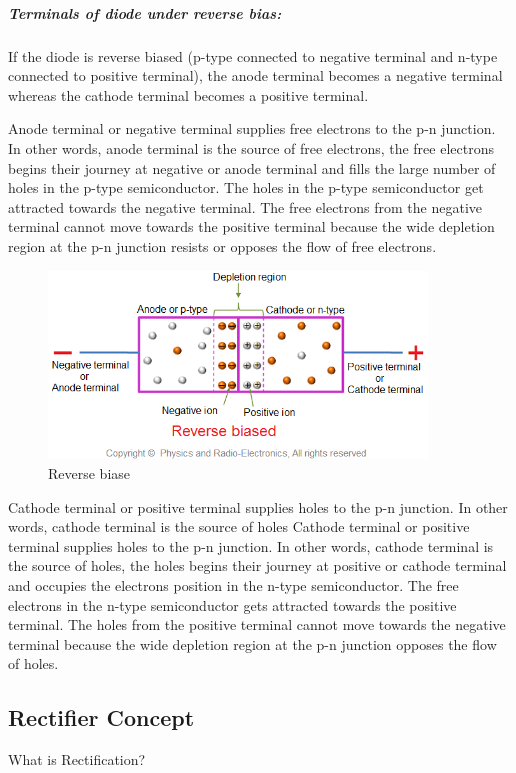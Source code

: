 \documentclass{article}
\begin{document}
\subparagraph{\large Terminals of diode under reverse bias:} 
If the diode is reverse biased (p-type connected to negative terminal and n-type connected to positive terminal), the anode terminal becomes a negative terminal whereas the cathode terminal becomes a positive terminal.

Anode terminal or negative terminal supplies free electrons to the p-n junction. In other words, anode terminal is the source of free electrons, the free electrons begins their journey at negative or anode terminal and fills the large number of holes in the p-type semiconductor. The holes in the p-type semiconductor get attracted towards the negative terminal. The free electrons from the negative terminal cannot move towards the positive terminal because the wide depletion region at the p-n junction resists or opposes the flow of free electrons.
\begin{figure}[H]
	\centering
	\includegraphics[height=5cm]{terminalsreversebias.png}
	\caption{Reverse biase}
\end{figure}

Cathode terminal or positive terminal supplies holes to the p-n junction. In other words, cathode terminal is the source of holes
Cathode terminal or positive terminal supplies holes to the p-n junction. In other words, cathode terminal is the source of holes, the holes begins their journey at positive or cathode terminal and occupies the electrons position in the n-type semiconductor. The free electrons in the n-type semiconductor gets attracted towards the positive terminal. The holes from the positive terminal cannot move towards the negative terminal because the wide depletion region at the p-n junction opposes the flow of holes.
	\subsection{Rectifier Concept}
	{\large What is Rectification?}
	
\end{document}
